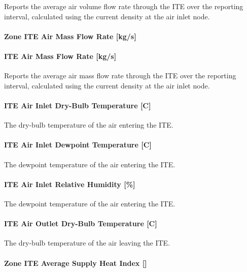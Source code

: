 Reports the average air volume flow rate through the ITE over the reporting interval, calculated using the current density at the air inlet node.

\paragraph{Zone ITE Air Mass Flow Rate {[}kg/s{]}}\label{zone-ite-air-mass-flow-rate-kgs}

\paragraph{ITE Air Mass Flow Rate {[}kg/s{]}}\label{ite-air-mass-flow-rate-kgs}

Reports the average air mass flow rate through the ITE over the reporting interval, calculated using the current density at the air inlet node.

\paragraph{ITE Air Inlet Dry-Bulb Temperature {[}C{]}}\label{ite-air-inlet-dry-bulb-temperature-c}

The dry-bulb temperature of the air entering the ITE.

\paragraph{ITE Air Inlet Dewpoint Temperature {[}C{]}}\label{ite-air-inlet-dewpoint-temperature-c}

The dewpoint temperature of the air entering the ITE.

\paragraph{ITE Air Inlet Relative Humidity {[}\%{]}}\label{ite-air-inlet-relative-humidity}

The dewpoint temperature of the air entering the ITE.

\paragraph{ITE Air Outlet Dry-Bulb Temperature {[}C{]}}\label{ite-air-outlet-dry-bulb-temperature-c}

The dry-bulb temperature of the air leaving the ITE.

\paragraph{Zone ITE Average Supply Heat Index {[]}}\label{zone-ite-average-supply-heat-index}

